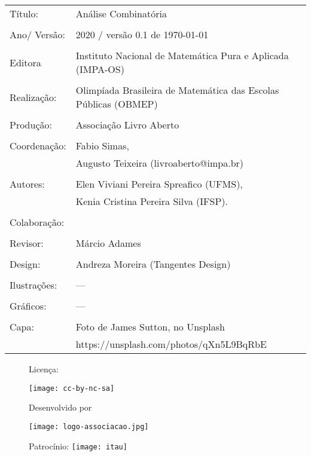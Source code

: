 \begin{tabular}{p{}p{}}
Título: & Análise Combinatória\\
\\
Ano/ Versão: & 2020 / versão 0.1 de \today\\
\\
Editora & Instituto Nacional de Matem\'atica Pura e Aplicada (IMPA-OS)\\
\\
Realização:& Olimp\'iada Brasileira de Matem\'atica das Escolas P\'ublicas (OBMEP)\\
\\
Produção:& Associação Livro Aberto\\
\\
Coordenação: & Fabio Simas, \\
			&  Augusto Teixeira (livroaberto@impa.br)\\
\\
  Autores: & Elen Viviani Pereira Spreafico (UFMS),\\
             & Kenia Cristina Pereira Silva (IFSP).\\
        
\\
Colaboração: & \\
\\
Revisor: & Márcio Adames \\

\\
Design: & Andreza Moreira (Tangentes Design) \\
\\
  Ilustrações: & --- \\ 
\\
Gráficos: & ---\\
\\
  Capa: & Foto de James Sutton, no Unsplash \\
  		& https://unsplash.com/photos/qXn5L9BqRbE \\

\end{tabular}
\vspace{.5cm}



\begin{figure}[b]
\begin{minipage}[l]{5cm}
\centering

{\large Licença:}

  \texttt{[image: cc-by-nc-sa]}
\end{minipage}\hfill
\begin{minipage}[c]{5cm}
\centering
{\large Desenvolvido por}

\texttt{[image: logo-associacao.jpg]}
\end{minipage}
\begin{minipage}[r]{5cm}
\centering

{\large Patrocínio:}
  \vspace{1em}
  \texttt{[image: itau]}
\end{minipage}
\end{figure}

